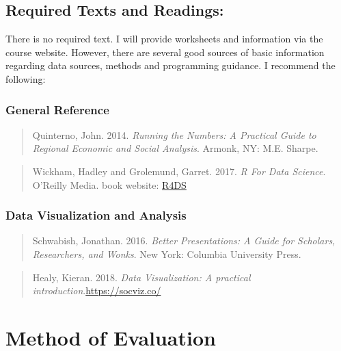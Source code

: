 \documentclass[11pt,]{article}
\begin{document}
\subsection{Required Texts and
Readings:}\label{required-texts-and-readings}

There is no required text. I will provide worksheets and information via
the course website. However, there are several good sources of basic
information regarding data sources, methods and programming guidance. I
recommend the following:

\subsubsection{General Reference}\label{general-reference}

\begin{quote}
Quinterno, John. 2014. \emph{Running the Numbers: A Practical Guide to
Regional Economic and Social Analysis}. Armonk, NY: M.E. Sharpe.
\end{quote}

\begin{quote}
Wickham, Hadley and Grolemund, Garret. 2017. \emph{R For Data Science}.
O'Reilly Media. book website: \href{https://r4ds.had.co.nz/}{R4DS}
\end{quote}

\subsubsection{Data Visualization and
Analysis}\label{data-visualization-and-analysis}

\begin{quote}
Schwabish, Jonathan. 2016. \emph{Better Presentations: A Guide for
Scholars, Researchers, and Wonks}. New York: Columbia University Press.
\end{quote}

\begin{quote}
Healy, Kieran. 2018. \emph{Data Visualization: A practical
introduction}.\url{https://socviz.co/}
\end{quote}

\section{Method of Evaluation}\label{method-of-evaluation}
\end{document}
